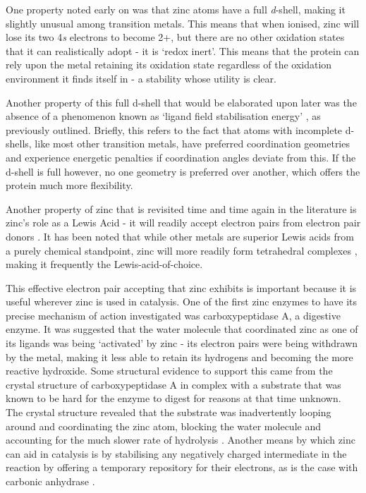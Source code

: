 One property noted early on \cite{vallee1984metallobiochemistry} was that zinc atoms have a full \textit{d}-shell, making it slightly unusual among transition metals. This means that when ionised, zinc will lose its two 4\textit{s} electrons to become 2+, but there are no other oxidation states that it can realistically adopt - it is `redox inert'. This means that the protein can rely upon the metal retaining its oxidation state regardless of the oxidation environment it finds itself in - a stability whose utility is clear.

Another property of this full d-shell that would be elaborated upon later was the absence of a phenomenon known as `ligand field stabilisation energy' \cite{lachenmann2004zinc,vahrenkamp2007does,maret2009coordination,krkezel2016biological}, as previously outlined. Briefly, this refers to the fact that atoms with incomplete d-shells, like most other transition metals, have preferred coordination geometries and experience energetic penalties if coordination angles deviate from this. If the d-shell is full however, no one geometry is preferred over another, which offers the protein much more flexibility.

Another property of zinc that is revisited time and time again in the literature is zinc's role as a Lewis Acid - it will readily accept electron pairs from electron pair donors \cite{williams1984zinc}. It has been noted that while other metals are superior Lewis acids from a purely chemical standpoint, zinc will more readily form tetrahedral complexes \cite{bertini1985zinc}, making it frequently the Lewis-acid-of-choice.

This effective electron pair accepting that zinc exhibits is important because it is useful wherever zinc is used in catalysis. One of the first zinc enzymes to have its precise mechanism of action investigated was carboxypeptidase A, a digestive enzyme. It was suggested that the water molecule that coordinated zinc as one of its ligands was being `activated' by zinc - its electron pairs were being withdrawn by the metal, making it less able to retain its hydrogens and becoming the more reactive hydroxide. Some structural evidence to support this came from the crystal structure of carboxypeptidase A in complex with a substrate that was known to be hard for the enzyme to digest for reasons at that time unknown. The crystal structure revealed that the substrate was inadvertently looping around and coordinating the zinc atom, blocking the water molecule and accounting for the much slower rate of hydrolysis \cite{christianson1986x}. Another means by which zinc can aid in catalysis is by stabilising any negatively charged intermediate in the reaction by offering a temporary repository for their electrons, as is the case with carbonic anhydrase \cite{christianson1996carbonic}.

